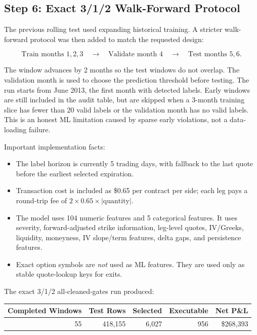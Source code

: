 \documentclass[11pt]{article}
\begin{document}
\subsection*{Step 6: Exact 3/1/2 Walk-Forward Protocol}

The previous rolling test used expanding historical training. A stricter
walk-forward protocol was then added to match the requested design:

\[
\text{Train months }1,2,3
\quad\rightarrow\quad
\text{Validate month }4
\quad\rightarrow\quad
\text{Test months }5,6.
\]

The window advances by 2 months so the test windows do not overlap. The
validation month is used to choose the prediction threshold before testing.
The run starts from June 2013, the first month with detected labels. Early
windows are still included in the audit table, but are skipped when a 3-month
training slice has fewer than 20 valid labels or the validation month has no
valid labels. This is an honest ML limitation caused by sparse early violations,
not a data-loading failure.

Important implementation facts:

\begin{itemize}
  \item The label horizon is currently 5 trading days, with fallback to the last
  quote before the earliest selected expiration.
  \item Transaction cost is included as \$0.65 per contract per side; each leg
  pays a round-trip fee of $2 \times 0.65 \times |\text{quantity}|$.
  \item The model uses 104 numeric features and 5 categorical features. It uses
  severity, forward-adjusted strike information, leg-level quotes, IV/Greeks,
  liquidity, moneyness, IV slope/term features, delta gaps, and persistence
  features.
  \item Exact option symbols are \emph{not} used as ML features. They are used
  only as stable quote-lookup keys for exits.
\end{itemize}

The exact 3/1/2 all-cleaned-gates run produced:

\begin{center}
\begin{tabular}{rrrrr}
\toprule
Completed Windows & Test Rows & Selected & Executable & Net P\&L \\
\midrule
55 & 418,155 & 6,027 & 956 & \$268,393 \\
\bottomrule
\end{tabular}
\end{center}
\end{document}
